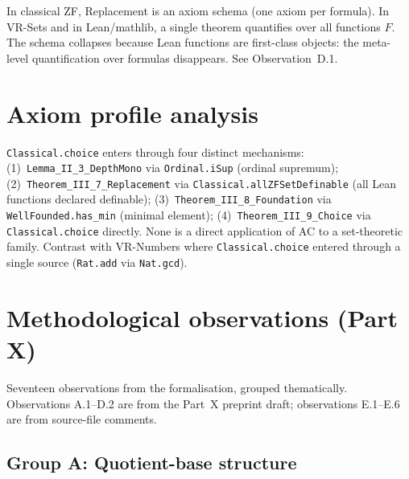 \begin{remark}
\label{rem:replacement_schema}
\leanok
{}
In classical ZF, Replacement is an axiom schema (one axiom per formula).
In VR-Sets and in Lean/mathlib, a single theorem quantifies over all
functions $F$.  The schema collapses because Lean functions are
first-class objects: the meta-level quantification over formulas
disappears.  See Observation~D.1.
\end{remark}

\section{Axiom profile analysis}
\label{sec:sets_axiom_profile_analysis}

\begin{remark}
\label{rem:classical_four_sources}
\leanok
\texttt{Classical.choice} enters through four distinct mechanisms:
(1)~\texttt{Lemma\_II\_3\_DepthMono} via \texttt{Ordinal.iSup}
(ordinal supremum);
(2)~\texttt{Theorem\_III\_7\_Replacement} via
\texttt{Classical.allZFSetDefinable} (all Lean functions declared
definable);
(3)~\texttt{Theorem\_III\_8\_Foundation} via
\texttt{WellFounded.has\_min} (minimal element);
(4)~\texttt{Theorem\_III\_9\_Choice} via \texttt{Classical.choice}
directly.  None is a direct application of AC to a set-theoretic
family.  Contrast with VR-Numbers where \texttt{Classical.choice}
entered through a single source (\texttt{Rat.add} via \texttt{Nat.gcd}).
\end{remark}

\section{Methodological observations (Part X)}
\label{sec:sets_method}

Seventeen observations from the formalisation, grouped thematically.
Observations A.1--D.2 are from the Part~X preprint draft; observations
E.1--E.6 are from source-file comments.

\subsection*{Group A: Quotient-base structure}

